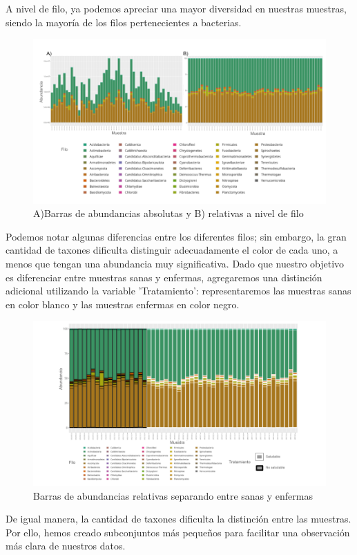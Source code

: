 A nivel de filo, ya podemos apreciar una mayor diversidad en nuestras muestras, siendo la mayoría de los filos pertenecientes a bacterias.\\
\begin{figure}[h]
\centering
\includegraphics[width=\textwidth]{Img/cap2/BarrasFilo.png}
\caption{A)Barras de abundancias absolutas y B) relativas a nivel de filo}
\end{figure}
Podemos notar algunas diferencias entre los diferentes filos; sin embargo, la gran cantidad de taxones dificulta distinguir adecuadamente el color de cada uno, a menos que tengan una abundancia muy significativa. Dado que nuestro objetivo es diferenciar entre muestras sanas y enfermas, agregaremos una distinción adicional utilizando la variable 'Tratamiento': representaremos las muestras sanas en color blanco y las muestras enfermas en color negro.\\
\begin{figure}[h]
\centering
\includegraphics[width=\textwidth]{Img/cap2/BarrasFilo_blackandwhite.png}
\caption{Barras de abundancias relativas separando entre sanas y enfermas}
\end{figure}
De igual manera, la cantidad de taxones dificulta la distinción entre las muestras. Por ello, hemos creado subconjuntos más pequeños para facilitar una observación más clara de nuestros datos.\\

